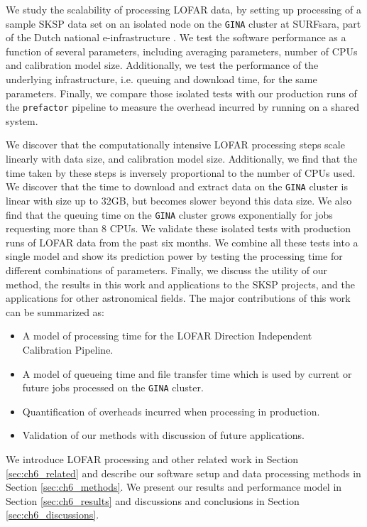 We study the scalability of processing LOFAR data, by setting up processing of a sample SKSP data set on an isolated node on the \texttt{GINA} cluster at SURFsara, part of the Dutch national e-infrastructure \citep{dutch_einfra}. We test the software performance as a function of several parameters, including averaging parameters, number of CPUs and calibration model size. Additionally, we test the performance of the underlying infrastructure, i.e. queuing  and download time, for the same parameters. Finally, we compare those isolated tests with our production runs of the \texttt{prefactor} pipeline to measure the overhead incurred by running on a shared system. 

We discover that the computationally intensive LOFAR processing steps scale linearly with data size, and calibration model size. Additionally, we find that the time taken by these steps is inversely proportional to the number of CPUs used. We discover that the time to download and extract data on the \texttt{GINA} cluster is linear with size up to 32GB, but becomes slower beyond this data size. We also find that the queuing time on the \texttt{GINA} cluster grows exponentially for jobs requesting more than 8 CPUs. We validate these isolated tests with production runs of LOFAR data from the past six months. We combine all these tests into a single model and show its prediction power by testing the processing time for different combinations of parameters. Finally, we discuss the utility of our method, the results in this work and applications to the SKSP projects, and the applications for other astronomical fields. The major contributions of this work can be summarized as:

\begin{itemize}
    \item A model of processing time for the  LOFAR Direction Independent Calibration Pipeline.
    \item A model of queueing time and file transfer time which is used by current or future jobs processed on the \texttt{GINA} cluster.
    \item Quantification of overheads incurred when processing in production. 
    \item Validation of our methods with discussion of future applications. 
\end{itemize}

We introduce LOFAR processing and other related work in Section \ref{sec:ch6_related} and describe our software setup and data processing methods in Section \ref{sec:ch6_methods}. We present our results and performance model in Section \ref{sec:ch6_results} and discussions and conclusions in Section \ref{sec:ch6_discussions}. 

